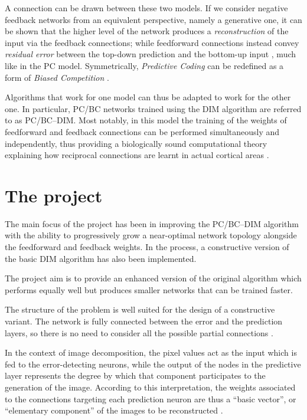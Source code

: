 \documentclass[11pt,a4paper]{report}
\newcommand{\quot}[1]{``#1''}
\begin{document}
		A connection can be drawn between these two models. If we consider negative feedback networks from an equivalent perspective, namely a generative one, it can be shown that the higher level of the network produces a \emph{reconstruction} of the input via the feedback connections; while feedforward connections instead convey \emph{residual error} between the top-down prediction and the bottom-up input \cite{spratling2009unsupervised}, much like in the PC model.
		Symmetrically, \emph{Predictive Coding} can be redefined as a form of \emph{Biased Competition} \cite{spratling2008predictive}.
		
		Algorithms that work for one model can thus be adapted to work for the other one. In particular, PC/BC networks trained using the DIM algorithm are referred to as PC/BC--DIM. Most notably, in this model the training of the weights of feedforward and feedback connections can be performed simultaneously and independently, thus providing a biologically sound computational theory explaining how reciprocal connections are learnt in actual cortical areas \cite{callaway1998local}\cite{spratling2012unsupervised}.
		
		\section{The project}
		The main focus of the project has been in improving the PC/BC--DIM algorithm with the ability to progressively grow a near-optimal network topology alongside the feedforward and feedback weights. In the process, a constructive version of the basic DIM algorithm has also been implemented.
		
		The project aim is to provide an enhanced version of the original algorithm which performs equally well but produces smaller networks that can be trained faster.
		
		The structure of the problem is well suited for the design of a constructive variant. The network is fully connected between the error and the prediction layers, so there is no need to 
		consider all the possible partial connections \cite{?}.
		
		In the context of image decomposition, the pixel values act as the input which is fed to the error-detecting neurons, while the output of the nodes in the predictive layer represents the degree by which that component participates to the generation of the image. According to this interpretation, the weights associated to the connections targeting each prediction neuron are thus a \quot{basic vector}, or \quot{elementary component} of the images to be reconstructed \cite{spratling2014predictive}.
\end{document}
